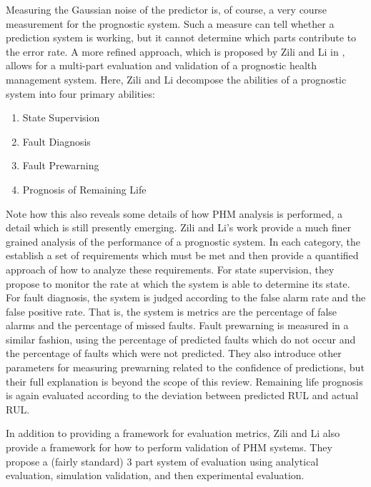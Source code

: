 \documentclass[12pt]{article}
\begin{document}
Measuring the Gaussian noise of the predictor is, of course, a very course
measurement for the prognostic system.  Such a measure can tell whether a
prediction system is working, but it cannot determine which parts contribute to
the error rate.  A more refined approach, which is proposed by Zili and Li in
\cite{5413560}, allows for a multi-part evaluation and validation of a
prognostic health management system.  Here, Zili and Li decompose the abilities
of a prognostic system into four primary abilities:
\begin{enumerate}
  \item State Supervision
  \item Fault Diagnosis
  \item Fault Prewarning
  \item Prognosis of Remaining Life
\end{enumerate}
Note how this also reveals some details of how PHM analysis is performed, a
detail which is still presently emerging.  Zili and Li's work provide a much
finer grained analysis of the performance of a prognostic system.  In each
category, the establish a set of requirements which must be met and then
provide a quantified approach of how to analyze these requirements.  For state
supervision, they propose to monitor the rate at which the system is able to
determine its state.  For fault diagnosis, the system is judged according to
the false alarm rate and the false positive rate.  That is, the system is
metrics are the percentage of false alarms and the percentage of missed
faults.  Fault prewarning is measured in a similar fashion, using the percentage
of predicted faults which do not occur and the percentage of faults which were
not predicted.  They also introduce other parameters for measuring prewarning
related to the confidence of predictions, but their full explanation is beyond
the scope of this review.  Remaining life prognosis is again evaluated
according to the deviation between predicted RUL and actual RUL.  

In addition to providing a framework for evaluation metrics, Zili and Li also
provide a framework for how to perform validation of PHM systems.  They propose
a (fairly standard) 3 part system of evaluation using analytical evaluation,
simulation validation, and then experimental evaluation.  
\end{document}
